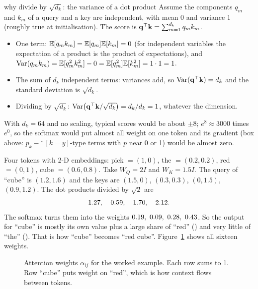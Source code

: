 \begin{probbox}{why divide by $\sqrt{d_k}$: the variance of a dot product}
Assume the components $q_m$ and $k_m$ of a query and a key are independent, with mean 0 and variance 1 (roughly true at initialisation). The score is $\mathbf{q}^\top\mathbf{k}=\sum_{m=1}^{d_k}q_mk_m$.
\begin{itemize}[leftmargin=*]
\item One term: $\mathbb{E}[q_mk_m]=\mathbb{E}[q_m]\mathbb{E}[k_m]=0$ (for independent variables the expectation of a product is the product of expectations), and $\mathrm{Var}(q_mk_m)=\mathbb{E}[q_m^2k_m^2]-0=\mathbb{E}[q_m^2]\mathbb{E}[k_m^2]=1\cdot1=1$.
\item The sum of $d_k$ independent terms: variances add, so $\mathrm{Var}(\mathbf{q}^\top\mathbf{k})=d_k$ and the standard deviation is $\sqrt{d_k}$.
\item Dividing by $\sqrt{d_k}$: $\mathrm{Var}\big(\mathbf{q}^\top\mathbf{k}/\sqrt{d_k}\big)=d_k/d_k=1$, whatever the dimension.
\end{itemize}
With $d_k=64$ and no scaling, typical scores would be about $\pm8$; $e^{8}\approx3000$ times $e^{0}$, so the softmax would put almost all weight on one token and its gradient (box above: $p_k-\mathbb 1[k=y]$-type terms with $p$ near 0 or 1) would be almost zero.
\end{probbox}

\begin{examplebox}
Four tokens with 2-D embeddings: pick $=(1,0)$, the $=(0.2,0.2)$, red $=(0,1)$, cube $=(0.6,0.8)$. Take $W_Q=2I$ and $W_K=1.5I$. The query of ``cube'' is $(1.2,1.6)$ and the keys are $(1.5,0)$, $(0.3,0.3)$, $(0,1.5)$, $(0.9,1.2)$. The dot products divided by $\sqrt2$ are
\[
1.27,\quad 0.59,\quad 1.70,\quad 2.12 .
\]
The softmax turns them into the weights $0.19,\ 0.09,\ 0.28,\ 0.43$. So the output for ``cube'' is mostly its own value plus a large share of ``red'' (\attdc) and very little of ``the'' (\attdb). That is how ``cube'' becomes ``red cube''. Figure~\ref{fig:attn} shows all sixteen weights.
\end{examplebox}

\begin{figure}[h]
\centering
{}
\caption{Attention weights $\alpha_{ij}$ for the worked example. Each row sums to 1. Row ``cube'' puts weight on ``red'', which is how context flows between tokens.}
\label{fig:attn}
\end{figure}

